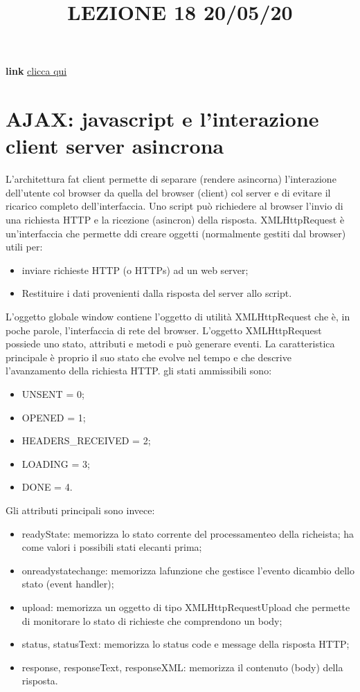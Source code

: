 \title{LEZIONE 18 20/05/20}
\textbf{link} \href{https://web.microsoftstream.com/video/71a20262-9f5a-4991-8c41-af0a21825730?list=user&userId=cfe0965d-9a7c-40e2-be6e-f078296a1914}{clicca qui}
\section{AJAX: javascript e l'interazione client server asincrona}
L'architettura fat client permette di separare (rendere asincorna) l'interazione dell'utente col browser da quella del browser (client) col server e di evitare il ricarico completo dell'interfaccia.\newline
\newline
Uno script può richiedere al browser l'invio di una richiesta HTTP e la ricezione (asincron) della risposta.\newline
XMLHttpRequest è un'interfaccia che permette ddi creare oggetti (normalmente gestiti dal browser) utili per:
\begin{itemize}
    \item inviare richieste HTTP (o HTTPs) ad un web server;
    \item Restituire i dati provenienti dalla risposta del server allo script.
\end{itemize}
L'oggetto globale window contiene l'oggetto di utilità XMLHttpRequest che è, in poche parole, l'interfaccia di rete del browser.\newline
\newline
L'oggetto XMLHttpRequest possiede uno stato, attributi e metodi e può generare eventi.\newline
La caratteristica principale è proprio il suo stato che evolve nel tempo e che descrive l'avanzamento della richiesta HTTP. gli stati ammissibili sono:
\begin{itemize}
    \item UNSENT = 0;
    \item OPENED = 1;
    \item HEADERS\_RECEIVED = 2;
    \item LOADING = 3;
    \item DONE = 4.
\end{itemize}
Gli attributi principali sono invece:
\begin{itemize}
    \item readyState: memorizza lo stato corrente del processamenteo della richeista; ha come valori i possibili stati elecanti prima;
    \item onreadystatechange: memorizza lafunzione che gestisce l'evento dicambio dello stato (event handler);
    \item upload: memorizza un oggetto di tipo XMLHttpRequestUpload che permette di monitorare lo stato di richieste che comprendono un body;
    \item status, statusText: memorizza lo status code e message della risposta HTTP;
    \item response, responseText, responseXML: memorizza il contenuto (body) della risposta.
\end{itemize}
